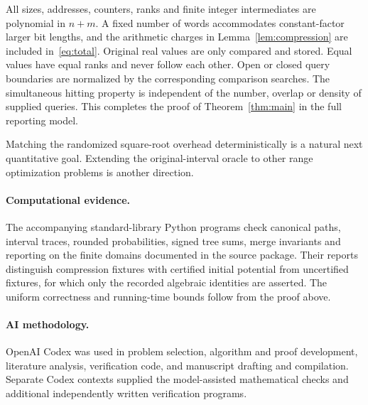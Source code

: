 \documentclass[acmsmall,11pt,nonacm,natbib=false]{acmart}
\begin{document}
All sizes, addresses, counters, ranks and finite integer intermediates are
polynomial in $n+m$. A fixed number of words accommodates constant-factor
larger bit lengths, and the arithmetic charges in Lemma~\ref{lem:compression}
are included in~\eqref{eq:total}. Original real values are only compared
and stored. Equal values have equal ranks and never follow each other.
Open or closed query boundaries are normalized by the corresponding
comparison searches. The simultaneous hitting property is independent of
the number, overlap or density of supplied queries. This completes the
proof of Theorem~\ref{thm:main} in the full reporting model.

Matching the randomized square-root overhead deterministically is a natural
next quantitative goal. Extending the original-interval oracle to other range
optimization problems is another direction.

\paragraph{Computational evidence.}
The accompanying standard-library Python programs check canonical paths,
interval traces, rounded probabilities, signed tree sums, merge invariants
and reporting on the finite domains documented in the source package.
Their reports distinguish compression fixtures with certified initial potential
from uncertified fixtures, for which only the recorded algebraic identities
are asserted. The uniform correctness and running-time bounds follow from
the proof above.

\paragraph{AI methodology.}
OpenAI Codex was used in problem selection, algorithm and proof development,
literature analysis, verification code, and manuscript drafting and compilation.
Separate Codex contexts supplied the model-assisted mathematical checks and
additional independently written verification programs.

\clearpage


\end{document}
